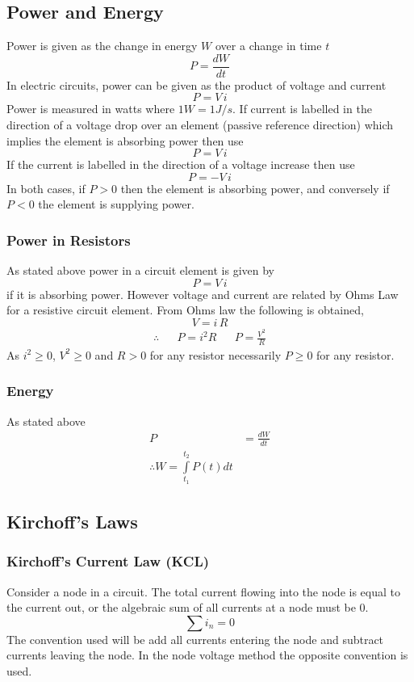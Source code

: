 \documentclass[14pt]{article}
\begin{document}
    \subsection{Power and Energy}
    Power is given as the change in energy $W$ over a change in time $t$
    $$P=\frac{dW}{dt}$$ In electric circuits, power can be given as the product of voltage and current
    $$P=V\, i$$
    Power is measured in watts where $1W=1J/s$. If current is labelled in the direction of a voltage drop over an element (passive reference direction) which implies the element is absorbing power then use
    $$P=V\, i$$
    If the current is labelled in the direction of a voltage increase then use 
    $$P=-V\,i$$
    In both cases, if $P>0$ then the element is absorbing power, and conversely if $P<0$ the element is supplying power.
    \subsubsection{Power in Resistors}
    As stated above power in a circuit element is given by 
    $$P=V\, i$$ if it is absorbing power. However voltage and current are related by Ohms Law for a resistive circuit element. From Ohms law the following is obtained,
    $$V=i\, R$$
    \begin{align*}
        \therefore && P=i^2R && P=\frac{V^2}{R}
    \end{align*}
    As $i^2\geq0$, $V^2\geq0$ and $R>0$ for any resistor necessarily $P\geq0$ for any resistor.
    \subsubsection{Energy}
    As stated above
    \begin{align*}
        P&=\frac{dW}{dt}\\
        \therefore W=\int\limits_{t_1}^{t_2}P(t)dt
    \end{align*}
    \subsection{Kirchoff's Laws}
    \subsubsection{Kirchoff's Current Law (KCL)}
    Consider a node in a circuit. The total current flowing into the node is equal to the current out, or the algebraic sum of all currents at a node must be 0.
    $$\sum i_n=0$$
    The convention used will be add all currents entering the node and subtract currents leaving the node. In the node voltage method the opposite convention is used.
\end{document}
